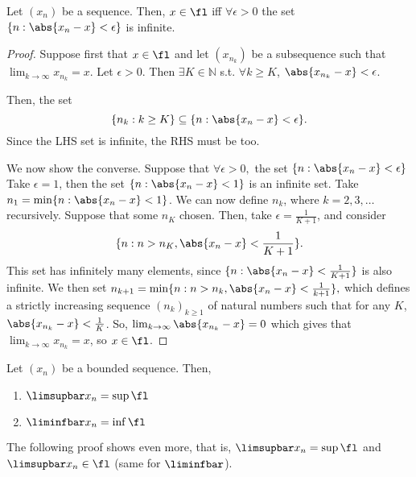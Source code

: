 \documentclass[12pt]{article}
\begin{document}
\begin{proposition}\label{prop:limitpointinifinite}
  Let $(x_n)$ be a sequence. Then, $x \in \fl$ iff $\forall \epsilon > 0$ the set $\{n : \abs{x_n - x} < \epsilon\}$ is infinite.
\end{proposition}

\begin{proof}
  Suppose first that $x \in \fl$ and let $(x_{n_k})$ be a subsequence such that $\lim_{k\to\infty} x_{n_k} = x$. Let $\epsilon > 0$. Then $\exists K \in \mathbb{N}$ s.t. $\forall k \geq K$, $\abs{x_{n_k} - x} < \epsilon$.

  Then, the set \[
  \{n_k : k \geq K\}   \subseteq \{n : \abs{x_n - x} < \epsilon\}.
  \]
  Since the LHS set is infinite, the RHS must be too.

  We now show the converse. Suppose that $\forall \epsilon > 0,$ the set $\{n : \abs{x_{n} - x} < \epsilon\}$ %
  Take $\epsilon = 1$, then the set $\{n : \abs{x_n - x} < 1\}$ is an infinite set. Take $n_1 = \min \{n : \abs{x_n - x} < 1\}$. We can now define $n_k$, where $k = 2,3,\dots$ recursively. Suppose that some $n_K$ chosen. Then, take $\epsilon = \frac{1}{K+1}$, and consider \[
  \{n : n > n_K, \abs{x_n - x} < \frac{1}{K+1}\}.  
  \]
  This set has infinitely many elements, since $\{n : \abs{x_n - x} < \frac{1}{K+1}\}$ is also infinite. %
  We then set $n_{k+1} = \min \{n : n > n_k, \abs{x_n - x} < \frac{1}{k+1}\},$ which defines a strictly increasing sequence $(n_k)_{k \geq 1}$ of natural numbers such that for any $K$, $\abs{x_{n_k} - x} < \frac{1}{K}$. So, $\lim_{k\to\infty} \abs{x_{n_k} - x} = 0$ which gives that $\lim_{k\to\infty} x_{n_k} = x$, so $x \in \fl$.
\end{proof}

\begin{theorem}\label{thm:limsupliminflimitpoints}
  Let $(x_n)$ be a bounded sequence. Then, \begin{enumerate}
    \item $\limsupbar x_n = \sup \fl$
    \item $\liminfbar x_n = \inf \fl$
  \end{enumerate}
\end{theorem}

\begin{remark}
  The following proof shows even more, that is, $\limsupbar x_n = \sup \fl$ and $\limsupbar x_n \in \fl$ (same for $\liminfbar$).
\end{remark}
\end{document}
